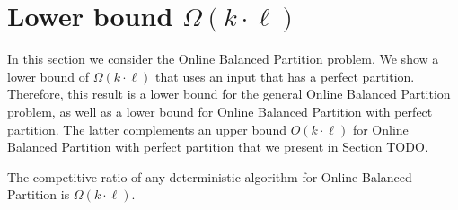 \section{Lower bound $\Omega(k\cdot \ell)$}



In this section we consider the Online Balanced Partition problem.
We show a lower bound of $\Omega(k \cdot \ell)$ that uses an input that has a perfect partition.
Therefore, this result is a lower bound for the general Online Balanced Partition problem, as well as a lower bound for Online Balanced Partition with perfect partition.
The latter complements an upper bound $O(k \cdot \ell)$ for Online Balanced Partition with perfect partition that we present in Section TODO.

\begin{theorem}
  The competitive ratio of any deterministic algorithm for Online Balanced Partition is $\Omega(k\cdot \ell)$.
\end{theorem}

